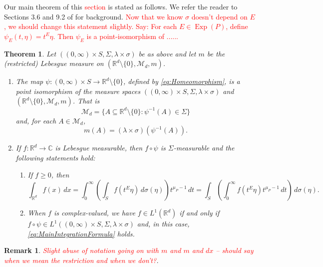 \documentclass[11pt]{article}
\theoremstyle{theorem}
\newtheorem{theorem}{Theorem}[section]
\newtheorem{remark}{Remark}
\newcommand\Exp{\operatorname{Exp}}
\begin{document}
\noindent Our main theorem of this \textcolor{red}{section} is stated as follows. We refer the reader to Sections 3.6 and 9.2 of \cite{Bogachev2007} for background. \textcolor{red}{Now that we know $\sigma$ doesn't depend on $E$, we should change this statement slightly. Say: For each $E\in\Exp(P)$, define $\psi_E(t,\eta)=t^E\eta$. Then $\psi_E$ is a point-isomorphism of ......}


\begin{theorem}\label{thm:MainIntegrationFormula}
Let $((0,\infty)\times S,\Sigma,\lambda\times\sigma)$ be as above and let $m$ be the (restricted) Lebesgue measure on $(\mathbb{R}^d\setminus\{0\},\mathcal{M}_d,m)$.
\begin{enumerate}
\item\label{item:MainIntegrationFormula1} The map $\psi: (0,\infty)\times S\to\mathbb{R}^d\setminus\{0\}$, defined by \eqref{eq:Homeomorphism}, is a point isomorphism of the measure spaces $((0,\infty)\times S,\Sigma,\lambda\times\sigma)$ and $(\mathbb{R}^d\setminus\{0\},\mathcal{M}_d,m)$. That is
\begin{equation*}
\mathcal{M}_d=\{A\subseteq \mathbb{R}^d\setminus\{0\}:\psi^{-1}(A)\in\Sigma\}
\end{equation*}
and, for each $A\in\mathcal{M}_d$,
\begin{equation*}
m(A)=(\lambda\times\sigma)(\psi^{-1}(A)).
\end{equation*}
\item\label{item:MainintegrationFormula2} If $f:\mathbb{R}^d\to\mathbb{C}$ is Lebesgue measurable, then $f\circ \psi$ is $\Sigma$-measurable and the following statements hold:
\begin{enumerate}
\item If $f\geq 0$, then
\begin{equation}\label{eq:MainIntegrationFormula}
\int_{\mathbb{R}^d}f(x)\,dx=\int_0^\infty\left(\int_S f(t^E\eta)\,d\sigma(\eta)\right)t^{\mu_P-1}\,dt=\int_S\left(\int_0^\infty f(t^E\eta)t^{\mu_P-1}\,dt\right)\,d\sigma(\eta).
\end{equation}
\item When $f$ is complex-valued, we have $f\in L^1(\mathbb{R}^d)$ if and only if $f\circ\psi\in L^1((0,\infty)\times S,\Sigma,\lambda\times\sigma)$ and, in this case, \eqref{eq:MainIntegrationFormula} holds.
\end{enumerate}
\end{enumerate}
\end{theorem}

\begin{remark}
\textcolor{red}{Slight abuse of notation going on with $m$ and $m$ and $dx$ -- should say when we mean the restriction and when we don't?}.
\end{remark}
\end{document}
